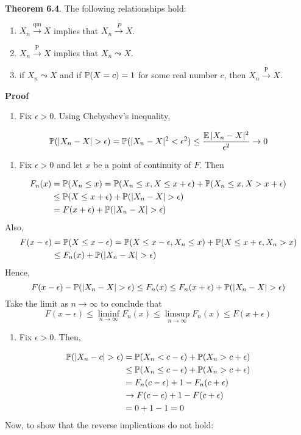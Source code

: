 \textbf{Theorem 6.4}. The following relationships hold:
\begin{enumerate}[label={\arabic*.}]
\item
  \(X_{n} \xrightarrow{\text{qm}} X\) implies that
  \(X_{n} \xrightarrow{P} X\).
\item
  \(X_{n} \xrightarrow{\textrm{P}} X\) implies that \(X_{n} \leadsto X\).
\item
  if \(X_{n} \leadsto X\) and if \(\operatorname{\mathbb{P}}(X = c) = 1\) for some real
  number \(c\), then \(X_{n} \xrightarrow{\textrm{P}} X\).
\end{enumerate}
\textbf{Proof}
\begin{enumerate}[tightlist,label={\arabic*.}]
\item
  Fix \(\epsilon > 0\). Using Chebyshev's inequality,
\end{enumerate}
\[
\operatorname{\mathbb{P}}(|X_{n} - X| > \epsilon) = \operatorname{\mathbb{P}}(|X_{n} - X|^{2} < \epsilon^{2}) \leq \frac{\operatorname{\mathbb{E}}|X_{n} - X|^{2}}{\epsilon^{2}} \rightarrow 0
\]
\begin{enumerate}[tightlist,label={\arabic*.}]
\item
  Fix \(\epsilon > 0\) and let \(x\) be a point of continuity of \(F\).
  Then
\end{enumerate}
\begin{align*}
F_{n}(x) & = \operatorname{\mathbb{P}}(X_{n} \leq x) = \operatorname{\mathbb{P}}(X_{n} \leq x, X \leq x + \epsilon) + \operatorname{\mathbb{P}}(X_{n} \leq x, X > x + \epsilon) \\
       & \leq \operatorname{\mathbb{P}}(X \leq x + \epsilon) + \operatorname{\mathbb{P}}(|X_{n} - X| > \epsilon) \\
       & = F(x + \epsilon) + \operatorname{\mathbb{P}}(|X_{n} - X| > \epsilon)
\end{align*}
Also,
\begin{align*}
F(x - \epsilon) & = \operatorname{\mathbb{P}}(X \leq x - \epsilon) = \operatorname{\mathbb{P}}(X \leq x - \epsilon, X_{n} \leq x) + \operatorname{\mathbb{P}}(X \leq x + \epsilon, X_{n} > x) \\
                & \leq F_{n}(x) + \operatorname{\mathbb{P}}(|X_{n} - X| > \epsilon)
\end{align*}
Hence,
\[
F(x - \epsilon) - \operatorname{\mathbb{P}}(|X_{n} - X| > \epsilon) \leq F_{n}(x) \leq F_{n}(x + \epsilon) + \operatorname{\mathbb{P}}(|X_{n} - X| > \epsilon)
\]
Take the limit as \(n \rightarrow \infty\) to conclude that
\[
F(x - \epsilon) \leq \liminf_{n \rightarrow \infty} F_{n}(x) \leq \limsup_{n \rightarrow \infty} F_{n}(x) \leq F(x + \epsilon)
\]
\begin{enumerate}[tightlist,label={\arabic*.},resume]
\item
  Fix \(\epsilon > 0\). Then,
\end{enumerate}
\begin{align*}
\operatorname{\mathbb{P}}(|X_{n} - c| > \epsilon) & = \operatorname{\mathbb{P}}(X_{n} < c - \epsilon) + \operatorname{\mathbb{P}}(X_{n} > c + \epsilon) \\
                                 & \leq \operatorname{\mathbb{P}}(X_{n} \leq c - \epsilon) + \operatorname{\mathbb{P}}(X_{n} > c + \epsilon) \\
                                 & = F_{n}(c - \epsilon) + 1 - F_{n}(c + \epsilon) \\
                                 & \rightarrow F(c - \epsilon) + 1 - F(c + \epsilon) \\
                                 & = 0 + 1 - 1 = 0
\end{align*}
Now, to show that the reverse implications do not hold:
